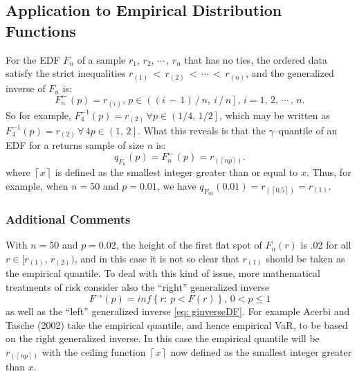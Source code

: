 \documentclass[graybox,envcountchap,sectrefs]{svmono}\usepackage[]{graphicx}\usepackage[]{xcolor}
\begin{document}
\begin{appendices}
\subsection*{Application to Empirical Distribution Functions}

For the EDF $F_{n}$ of a sample $r_{1},\,r_{2},\,\cdots\,,\,r_{n}$
that has no ties, the ordered data satisfy the strict inequalities
$r_{(1)}\,<\,r_{(2)}\,<\,\cdots\,<\,r_{(n)}$, and the generalized
inverse of $F_{n}$ is:
\begin{equation}
F_{n}^{\leftarrow}(p)=r_{(i)},\,p\in\left((i\,-\,1)\,/\,n,\ i\,/\,n\right],\,i=1,\,2,\,\cdots\,,\,n.\label{eq: ginverseEDF}
\end{equation}
So for example, $F_{4}^{-1}(p)=r_{(2)}\,\forall p\in\left(1/4,\,1/2\right]$,
which may be written as $F_{4}^{-1}(p)=r_{(2)}\,\forall\,4p\in\left(1,\,2\right]$.
What this reveals is that the $\gamma$--quantile of an EDF for a
returns sample of size $n$ is:
\[
q_{F_{n}}(p)=F_{n}^{\leftarrow}(p)=r_{(\left\lceil np\right\rceil )}.
\]
where $\left\lceil x\right\rceil $ is defined as the smallest integer
greater than or equal to $x$. Thus, for example, when $n=50$ and
$p=0.01$, we have $q_{F_{50}}(0.01)=r_{(\left\lceil 0.5\right\rceil )}=r_{(1)}$.

\subsubsection*{Additional Comments}

With $n=50$ and $p=0.02$, the height of the first flat spot of $F_{n}(r)$
is .02 for all $r\in[r_{(1)},\,r_{(2)})$, and in this case it is
not so clear that $r_{(1)}$ should be taken as the empirical quantile.
To deal with this kind of issue, more mathematical treatments of risk
consider also the ``right'' generalized inverse
\begin{equation}
F^{\rightarrow}(p)=inf\left\{ r:\,p<F(r)\right\} ,\,0<p\leqslant1\label{eq: rightGinverseDF}
\end{equation}
as well as the ``left'' generalized inverse \ref{eq: ginverseDF}.
For example Acerbi and Tasche (2002) take the empirical quantile,
and hence empirical VaR, to be based on the right generalized inverse.
In this case the empirical quantile will be $r_{(\left\lceil np\right\rceil )}$
with the ceiling function $\left\lceil x\right\rceil $ now defined
as the smallest integer greater than $x$.

\end{appendices}

\pagebreak{}

\begin{flushleft}
\printbibliography
\par\end{flushleft}

\newpage
\end{document}
